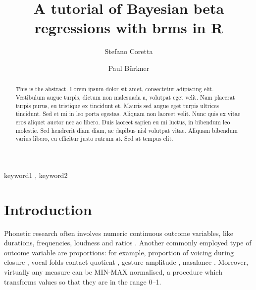 \documentclass[
  authoryear,
  preprint,
  3p]{elsarticle}
\begin{document}
\begin{frontmatter}
\title{A tutorial of Bayesian beta regressions with brms in R}
\author[1]{Stefano Coretta%
%
}
\author[]{Paul Bürkner%
%
}



        
\begin{abstract}
This is the abstract. Lorem ipsum dolor sit amet, consectetur adipiscing
elit. Vestibulum augue turpis, dictum non malesuada a, volutpat eget
velit. Nam placerat turpis purus, eu tristique ex tincidunt et. Mauris
sed augue eget turpis ultrices tincidunt. Sed et mi in leo porta
egestas. Aliquam non laoreet velit. Nunc quis ex vitae eros aliquet
auctor nec ac libero. Duis laoreet sapien eu mi luctus, in bibendum leo
molestie. Sed hendrerit diam diam, ac dapibus nisl volutpat vitae.
Aliquam bibendum varius libero, eu efficitur justo rutrum at. Sed at
tempus elit.
\end{abstract}





\begin{keyword}
    keyword1 \sep 
    keyword2
\end{keyword}
\end{frontmatter}
    

\section{Introduction}\label{introduction}

Phonetic research often involves numeric continuous outcome variables,
like durations, frequencies, loudness and ratios
\citep{kluender1988, johnson2003, gick2013, ladefoged2014, abramson2017, roettger2018, coretta2023, rosen2005}.
Another commonly employed type of outcome variable are proportions: for
example, proportion of voicing during closure \citep{davidson2016},
vocal folds contact quotient \citep{herbst2017}, gesture amplitude
\citep{carignan2021}, nasalance \citep{carignan2021}. Moreover,
virtually any measure can be MIN-MAX normalised, a procedure which
transforms values so that they are in the range 0--1.
\end{document}
